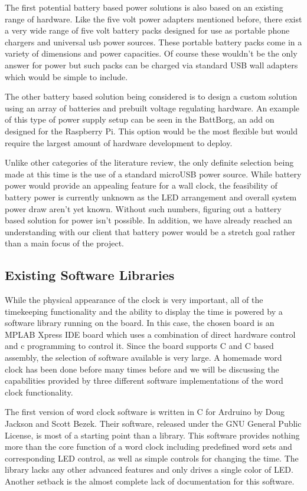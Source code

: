 \documentclass[onecolumn, draftclsnofoot,10pt, compsoc]{IEEEtran}
\begin{document}
The first potential battery based power solutions is also based on an existing range of hardware.
Like the five volt power adapters mentioned before, there exist a very wide range of five volt battery packs designed for use as portable phone chargers and universal usb power sources.
These portable battery packs come in a variety of dimensions and power capacities.
Of course these wouldn’t be the only answer for power but such packs can be charged via standard USB wall adapters which would be simple to include.

The other battery based solution being considered is to design a custom solution using an array of batteries and prebuilt voltage regulating hardware.
An example of this type of power supply setup can be seen in the BattBorg, an add on designed for the Raspberry Pi. \cite{power1}
This option would be the most flexible but would require the largest amount of hardware development to deploy.

Unlike other categories of the literature review, the only definite selection being made at this time is the use of a standard microUSB power source.
While battery power would provide an appealing feature for a wall clock, the feasibility of battery power is currently unknown as the LED arrangement and overall system power draw aren’t yet known.
Without such numbers, figuring out a battery based solution for power isn’t possible.
In addition, we have already reached an understanding with our client that battery power would be a stretch goal rather than a main focus of the project.

\subsection{Existing Software Libraries}

While the physical appearance of the clock is very important, all of the timekeeping functionality and the ability to display the time is powered by a software library running on the board.
In this case, the chosen board is an MPLAB Xpress IDE board which uses a combination of direct hardware control and c programming to control it.
Since the board supports C and C based assembly, the selection of software available is very large.
A homemade word clock has been done before many times before and we will be discussing the capabilities provided by three different software implementations of the word clock functionality.

The first version of word clock software is written in C for Ardruino by Doug Jackson and Scott Bezek.
Their software, released under the GNU General Public License, is most of a starting point than a library. \cite{software1}
This software provides nothing more than the core function of a word clock including predefined word sets and corresponding LED control, as well as simple controls for changing the time.
The library lacks any other advanced features and only drives a single color of LED.
Another setback is the almost complete lack of documentation for this software.
\end{document}
